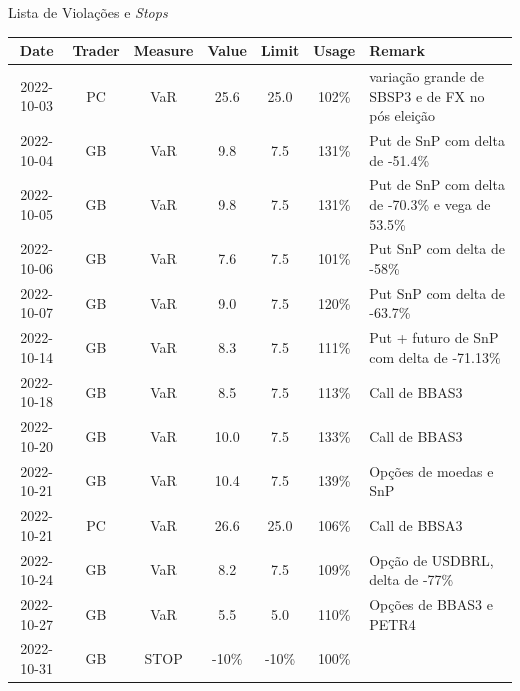 \documentclass[t,aspectratio=169]{beamer}
\begin{document}
\begin{frame}{Lista de Violações e \textit{Stops}}
\begin{table}
	\scriptsize
	\begin{tabular}{|c|c|c|c|c|c|l|}
		\hline
		\textbf{Date} & \textbf{Trader} & \textbf{Measure} & \textbf{Value} & \textbf{Limit} & \textbf{Usage} & \textbf{Remark}                                            \\ \hline
		2022-10-03 & PC     & VaR     & 25.6  & 25.0  & {\color[HTML]{FE0000} 102\%} & variação grande de SBSP3 e de FX no pós eleição\\ \hline
		2022-10-04 & GB     & VaR     & 9.8   & 7.5   & {\color[HTML]{FE0000} 131\%} & Put de SnP com delta de -51.4\%  \\ \hline
		2022-10-05 & GB     & VaR     & 9.8   & 7.5   & {\color[HTML]{FE0000} 131\%} & Put de SnP com delta de -70.3\% e vega de 53.5\%  \\ \hline
		2022-10-06 & GB     & VaR     & 7.6   & 7.5   & {\color[HTML]{FE0000} 101\%} & Put SnP com delta de -58\%   \\ \hline
		2022-10-07 & GB     & VaR     & 9.0   & 7.5   & {\color[HTML]{FE0000} 120\%} & Put SnP com delta de -63.7\% \\ \hline
		2022-10-14 & GB     & VaR     & 8.3   & 7.5   & {\color[HTML]{FE0000} 111\%} & Put + futuro de SnP com delta de -71.13\%  \\ \hline
		2022-10-18 & GB     & VaR     & 8.5   & 7.5   & {\color[HTML]{FE0000} 113\%} & Call de BBAS3 \\ \hline
		2022-10-20 & GB     & VaR     & 10.0  & 7.5   & {\color[HTML]{FE0000} 133\%} & Call de BBAS3 \\ \hline
		2022-10-21 & GB     & VaR     & 10.4  & 7.5   & {\color[HTML]{FE0000} 139\%} & Opções de moedas e SnP \\ \hline
		2022-10-21 & PC     & VaR     & 26.6  & 25.0  & {\color[HTML]{FE0000} 106\%} & Call de BBSA3 \\ \hline
		2022-10-24 & GB     & VaR     & 8.2   & 7.5   & {\color[HTML]{FE0000} 109\%} & Opção de USDBRL, delta de -77\%  \\ \hline
		2022-10-27 & GB     & VaR     & 5.5   & 5.0   & {\color[HTML]{FE0000} 110\%} & Opções de BBAS3 e PETR4 \\ \hline
		2022-10-31 & GB     & STOP    & -10\% & -10\% & {\color[HTML]{FE0000} 100\%} & {} \\ \hline
	\end{tabular}
\end{table}	
\end{frame}
\end{document}
